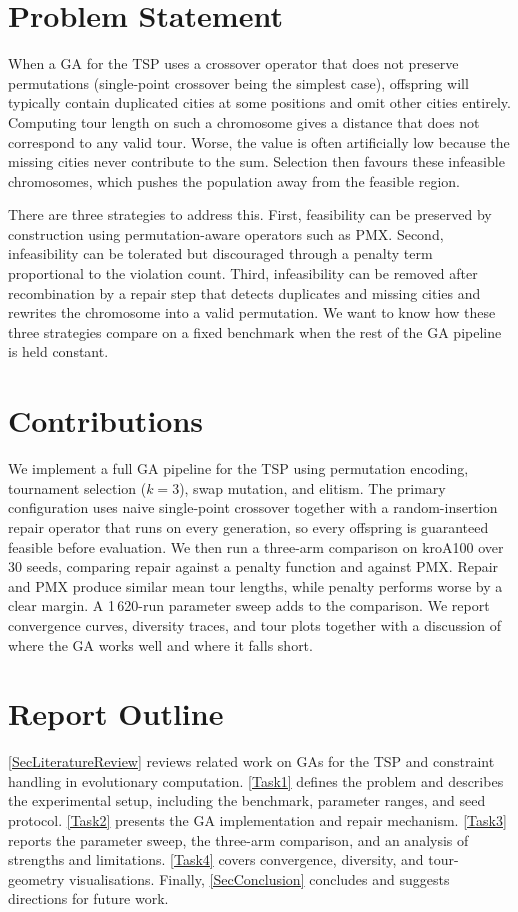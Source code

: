 \section{Problem Statement}
\label{Intro:ProblemStatement}

When a GA for the TSP uses a crossover operator that does not preserve
permutations (single-point crossover being the simplest case),
offspring will typically contain duplicated cities at some positions and
omit other cities entirely. Computing tour length on such a chromosome
gives a distance that does not correspond to any valid tour. Worse, the
value is often artificially low because the missing cities never
contribute to the sum. Selection then favours these infeasible
chromosomes, which pushes the population away from the feasible region.

There are three strategies to address this. First, feasibility can be
preserved by construction using permutation-aware operators such as PMX.
Second, infeasibility can be tolerated but discouraged through a penalty
term proportional to the violation count. Third, infeasibility can be
removed after recombination by a repair step that detects duplicates and
missing cities and rewrites the chromosome into a valid permutation. We
want to know how these three strategies compare on a fixed benchmark
when the rest of the GA pipeline is held constant.

\section{Contributions}
\label{Intro:Contributions}

We implement a full GA pipeline for the TSP using permutation encoding,
tournament selection ($k=3$), swap mutation, and elitism. The primary
configuration uses naive single-point crossover together with a
random-insertion repair operator that runs on every generation, so every
offspring is guaranteed feasible before evaluation. We then run a
three-arm comparison on kroA100 over 30 seeds, comparing repair against
a penalty function and against PMX. Repair and PMX produce similar mean
tour lengths, while penalty performs worse by a clear margin. A
1\,620-run parameter sweep adds to the comparison. We report convergence
curves, diversity traces, and tour plots together with a discussion of
where the GA works well and where it falls short.

\section{Report Outline}
\label{Intro:Outline}

\cref{SecLiteratureReview} reviews related work on GAs for the TSP and
constraint handling in evolutionary computation.
\cref{Task1} defines the problem and describes the experimental setup,
including the benchmark, parameter ranges, and seed protocol.
\cref{Task2} presents the GA implementation and repair mechanism.
\cref{Task3} reports the parameter sweep, the three-arm comparison, and
an analysis of strengths and limitations.
\cref{Task4} covers convergence, diversity, and tour-geometry
visualisations. Finally, \cref{SecConclusion} concludes and suggests
directions for future work.
